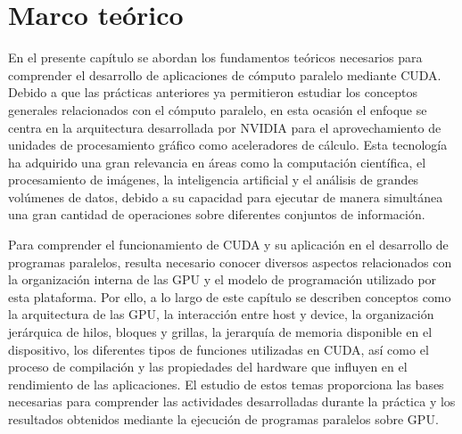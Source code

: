 
\chapter{Marco teórico}

En el presente capítulo se abordan los fundamentos teóricos necesarios para comprender el desarrollo de aplicaciones de cómputo paralelo mediante CUDA. Debido a que las prácticas anteriores ya permitieron estudiar los conceptos generales relacionados con el cómputo paralelo, en esta ocasión el enfoque se centra en la arquitectura desarrollada por NVIDIA para el aprovechamiento de unidades de procesamiento gráfico como aceleradores de cálculo. Esta tecnología ha adquirido una gran relevancia en áreas como la computación científica, el procesamiento de imágenes, la inteligencia artificial y el análisis de grandes volúmenes de datos, debido a su capacidad para ejecutar de manera simultánea una gran cantidad de operaciones sobre diferentes conjuntos de información.

Para comprender el funcionamiento de CUDA y su aplicación en el desarrollo de programas paralelos, resulta necesario conocer diversos aspectos relacionados con la organización interna de las GPU y el modelo de programación utilizado por esta plataforma. Por ello, a lo largo de este capítulo se describen conceptos como la arquitectura de las GPU, la interacción entre host y device, la organización jerárquica de hilos, bloques y grillas, la jerarquía de memoria disponible en el dispositivo, los diferentes tipos de funciones utilizadas en CUDA, así como el proceso de compilación y las propiedades del hardware que influyen en el rendimiento de las aplicaciones. El estudio de estos temas proporciona las bases necesarias para comprender las actividades desarrolladas durante la práctica y los resultados obtenidos mediante la ejecución de programas paralelos sobre GPU.


